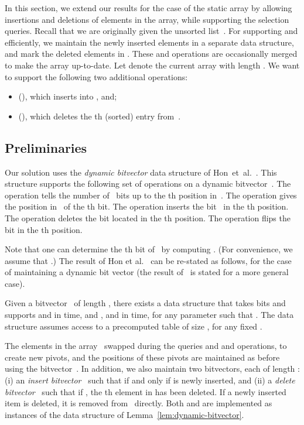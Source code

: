 In this section, we extend our results for the case of the static array by allowing 
insertions and deletions of elements in the array, while supporting the selection 
queries. Recall that we are originally given the unsorted list~\A. 
For supporting  and  efficiently, we maintain the newly inserted elements in a
separate data structure, and mark the deleted elements in . These  and  operations are 
occasionally merged to make the array up-to-date. 
Let  denote the current array with length . We want to support the following 
two additional operations:
\begin{itemize}
	\item \ins(), which inserts  into , and;
	\item \del(), which deletes the th (sorted) entry from~.
\end{itemize}

\subsection{Preliminaries}
\label{section:dynamic-preliminaries}

Our solution uses the \emph{dynamic bitvector} data structure of Hon~et~al.~\cite{hon:dynamic-bitvector}. This structure supports the following set of operations on a dynamic bitvector~. 
The  operation tells the number of~ bits up to the th position in~.
The  operation gives the position in~ of the th  bit.
The  operation inserts the bit~ in the th position.
The  operation deletes the bit located in the th position.
The  operation flips the bit in the th position.


Note that one can determine the th bit of~ by computing . (For convenience, we assume that .)
The result of Hon et al.~\cite[Theorem~1]{hon:dynamic-bitvector} can be re-stated as follows, for the case of maintaining a dynamic bit vector (the result of~\cite{hon:dynamic-bitvector} is stated
for a more general case).

\begin{lemma}
\label{lem:dynamic-bitvector}
Given a bitvector~ of length , there exists a data structure that takes  bits and 
supports  and  in  time, and ,  and  in
 time, for any parameter  such that . The data structure 
assumes access to a precomputed table of size , for any fixed .
\end{lemma}

The elements in the array~ swapped during the queries and  and  operations,
to create new pivots, and the positions of these pivots are maintained
as before using the bitvector~. In addition, we also maintain two  
bitvectors, each of length : (i) an \emph{insert bitvector}~ such 
that  if and only if  is newly inserted, and (ii) a 
\emph{delete bitvector}~ such that if , the th 
element in  has been deleted. If a newly inserted item is deleted, 
it is removed from~ directly. Both  and  are implemented 
as instances of the data structure of Lemma~\ref{lem:dynamic-bitvector}.


